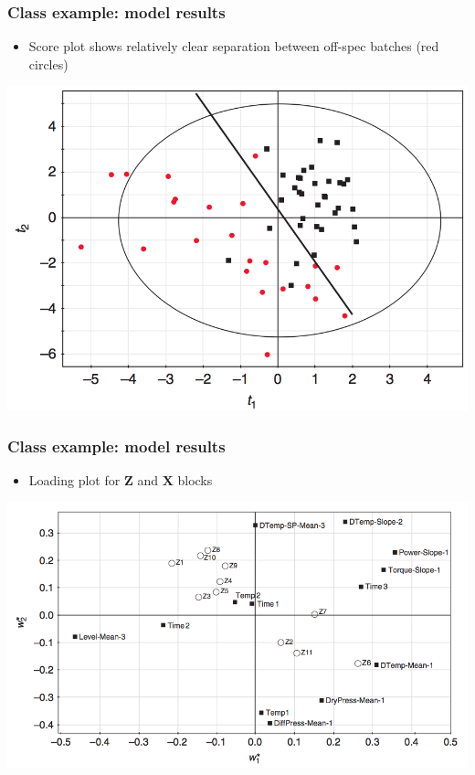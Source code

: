 \begin{frame}\frametitle{Class example: model results}
	
	\begin{itemize}
		\item	Score plot shows relatively clear separation between off-spec batches (red circles)
	\end{itemize}

	\begin{center}
		\includegraphics[width=\textwidth]{images/fmc/fmc-score-plot-features.png}
	\end{center}
\end{frame}

\begin{frame}\frametitle{Class example: model results}
	
	\begin{itemize}
		\item	Loading plot for \( \mathbf{Z} \) and \( \mathbf{X} \) blocks
	\end{itemize}
	
	\begin{center}
		\includegraphics[width=\textwidth]{images/fmc/fmc-features-loading-plot.png}
	\end{center}
	
\end{frame}

